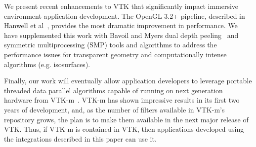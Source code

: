 We present recent enhancements to VTK that significantly impact immersive
environment application development. The OpenGL 3.2+ pipeline, described in Hanwell et al~\cite{Hanwell:2015}, provides the most dramatic improvement in performance. We have supplemented this work with Bavoil and Myers dual depth peeling~\cite{Bavoil:2008} and symmetric multiprocessing (SMP) tools and algorithms to address the performance issues for transparent geometry and computationally intense algorithms (e.g. isosurfaces).

Finally, our work will eventually allow application developers to leverage portable threaded data parallel algorithms capable of running on next generation hardware from VTK-m~\cite{Moreland:2016}. VTK-m has shown impressive results in its first two years of development, and, as the number of filters available in VTK-m's repository grows, the plan is to make them available in the next major release of VTK. Thus, if VTK-m is contained in VTK, then applications developed using the integrations described in this paper can use it.


